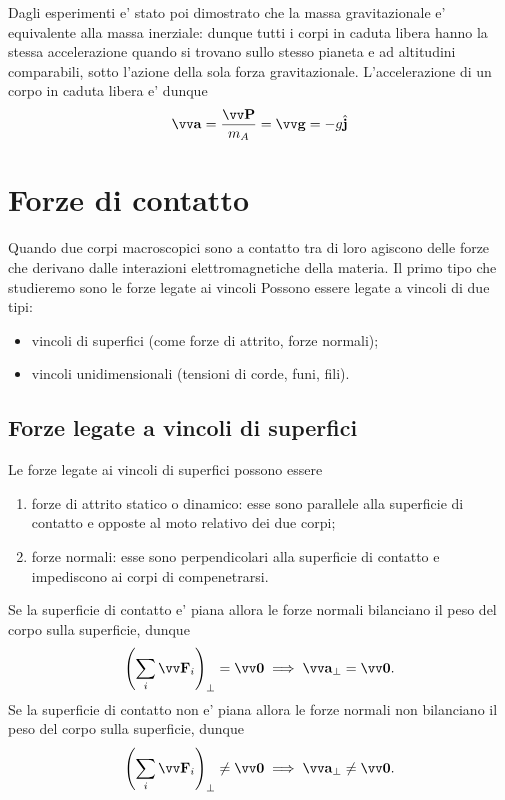 Dagli esperimenti e' stato poi dimostrato che la massa gravitazionale e' equivalente alla massa inerziale: dunque tutti i corpi in caduta libera hanno la stessa accelerazione quando si trovano sullo stesso pianeta e ad altitudini comparabili, sotto l'azione della sola forza gravitazionale.
L'accelerazione di un corpo in caduta libera e' dunque
\begin{equation}
    \bvv{a} = \frac{\bvv{P}}{m_A} = \bvv{g} = -g\bh{j}
\end{equation}

\section{Forze di contatto}
Quando due corpi macroscopici sono a contatto tra di loro agiscono delle forze che derivano dalle interazioni elettromagnetiche della materia. Il primo tipo che studieremo sono le forze legate ai vincoli
Possono essere legate a vincoli di due tipi:
\begin{itemize}
    \item vincoli di superfici (come forze di attrito, forze normali);
    \item vincoli unidimensionali (tensioni di corde, funi, fili).
\end{itemize}

\subsection{Forze legate a vincoli di superfici}
Le forze legate ai vincoli di superfici possono essere
\begin{enumerate}
    \item forze di attrito statico o dinamico: esse sono parallele alla superficie di contatto e opposte al moto relativo dei due corpi;
    \item forze normali: esse sono perpendicolari alla superficie di contatto e impediscono ai corpi di compenetrarsi.
\end{enumerate}
Se la superficie di contatto e' piana allora le forze normali bilanciano il peso del corpo sulla superficie, dunque 
\begin{equation}
    \left(\sum_i \bvv{F}_i \right)_{\perp} = \bvv{0} \implies \bvv{a}_{\perp} = \bvv{0}.
\end{equation}
Se la superficie di contatto non e' piana allora le forze normali non bilanciano il peso del corpo sulla superficie, dunque 
\begin{equation}
    \left(\sum_i \bvv{F}_i \right)_{\perp} \neq \bvv{0} \implies \bvv{a}_{\perp} \neq \bvv{0}.
\end{equation}

